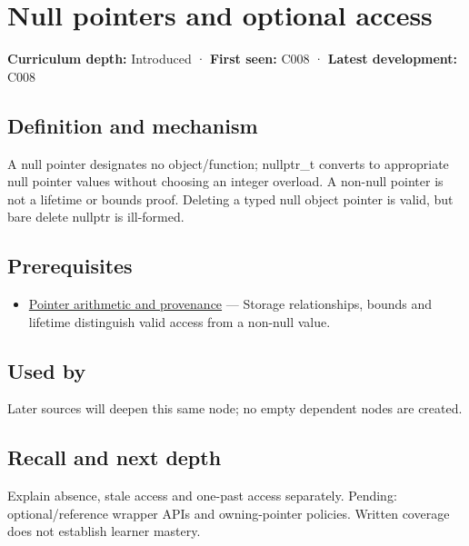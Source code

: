 \hypertarget{appendix-afae48c31800}{}
\section{Null pointers and optional access}\label{appendix-afae48c31800-null-pointers-and-optional-access}

\textbf{Curriculum depth:} Introduced · \textbf{First seen:} C008 · \textbf{Latest development:} C008

\subsection{Definition and mechanism}\label{appendix-afae48c31800-definition-and-mechanism}

A null pointer designates no object/function; nullptr\_t converts to appropriate null pointer values without choosing an integer overload. A non-null pointer is not a lifetime or bounds proof. Deleting a typed null object pointer is valid, but bare delete nullptr is ill-formed.

\subsection{Prerequisites}\label{appendix-afae48c31800-prerequisites}

\begin{itemize}
\tightlist
\item
  \hyperref[appendix-6af5921bc853]{Pointer arithmetic and provenance} --- Storage relationships, bounds and lifetime distinguish valid access from a non-null value.
\end{itemize}

\subsection{Used by}\label{appendix-afae48c31800-used-by}

Later sources will deepen this same node; no empty dependent nodes are created.

\subsection{Recall and next depth}\label{appendix-afae48c31800-recall-and-next-depth}

Explain absence, stale access and one-past access separately. Pending: optional/reference wrapper APIs and owning-pointer policies. Written coverage does not establish learner mastery.

